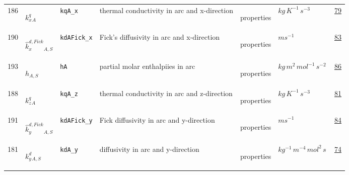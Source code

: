 \begin{longtable}{|p{1cm}|p{2.5cm}|p{4.5cm}|p{8cm}|p{3.0cm}|p{3cm}|p{1cm}|}
            186
             & \hypertarget{"v:186"}{ $ {{k^q_x}}{_{A}} $}
             & \verb|kqA_x|
             & thermal conductivity in arc and x-direction
             & \begin{lay}properties \end{lay}
             & $ kg \,K^{-1} \,s^{-3} \, $
             &                 \hyperlink{"e:79"}{ 79 }
                 \\
            190
             & \hypertarget{"v:190"}{ $ {{\hat{k}^{d,Fick}_x}}{_{A, S}} $}
             & \verb|kdAFick_x|
             & Fick's diffusivity in arc and x-direction
             & \begin{lay}properties \end{lay}
             & $ m s^{-1} \, $
             &                 \hyperlink{"e:83"}{ 83 }
                 \\
            193
             & \hypertarget{"v:193"}{ $ {h}{_{A, S}} $}
             & \verb|hA|
             & partial molar enthalpiies in arc
             & \begin{lay}properties \end{lay}
             & $ kg \,m^{2} \,mol^{-1} \,s^{-2} \, $
             &                 \hyperlink{"e:86"}{ 86 }
                 \\
            188
             & \hypertarget{"v:188"}{ $ {{k^q_z}}{_{A}} $}
             & \verb|kqA_z|
             & thermal conductivity in arc and z-direction
             & \begin{lay}properties \end{lay}
             & $ kg \,K^{-1} \,s^{-3} \, $
             &                 \hyperlink{"e:81"}{ 81 }
                 \\
            191
             & \hypertarget{"v:191"}{ $ {{\hat{k}^{d,Fick}_y}}{_{A, S}} $}
             & \verb|kdAFick_y|
             & Fick diffusivity in arc and y-direction
             & \begin{lay}properties \end{lay}
             & $ m s^{-1} \, $
             &                 \hyperlink{"e:84"}{ 84 }
                 \\
            181
             & \hypertarget{"v:181"}{ $ {{k^d_y}}{_{A, S}} $}
             & \verb|kdA_y|
             & diffusivity in arc and y-direction
             & \begin{lay}properties \end{lay}
             & $ kg^{-1} \,m^{-4} \,mol^{2} \,s \, $
             &                 \hyperlink{"e:74"}{ 74 }

\end{longtable}
